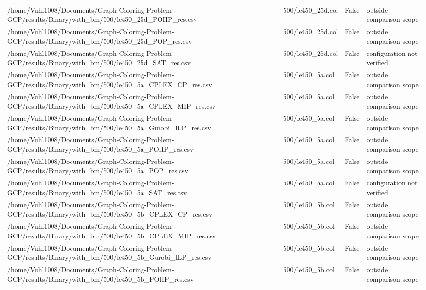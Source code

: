 \begin{table}[htbp]
\begin{tabular}{llll}
/home/Vuhl1008/Documents/Graph-Coloring-Problem-GCP/results/Binary/with\_bm/500/le450\_25d\_POHP\_res.csv & 500/le450\_25d.col & False & outside comparison scope \\
/home/Vuhl1008/Documents/Graph-Coloring-Problem-GCP/results/Binary/with\_bm/500/le450\_25d\_POP\_res.csv & 500/le450\_25d.col & False & outside comparison scope \\
/home/Vuhl1008/Documents/Graph-Coloring-Problem-GCP/results/Binary/with\_bm/500/le450\_25d\_SAT\_res.csv & 500/le450\_25d.col & False & configuration not verified \\
/home/Vuhl1008/Documents/Graph-Coloring-Problem-GCP/results/Binary/with\_bm/500/le450\_5a\_CPLEX\_CP\_res.csv & 500/le450\_5a.col & False & outside comparison scope \\
/home/Vuhl1008/Documents/Graph-Coloring-Problem-GCP/results/Binary/with\_bm/500/le450\_5a\_CPLEX\_MIP\_res.csv & 500/le450\_5a.col & False & outside comparison scope \\
/home/Vuhl1008/Documents/Graph-Coloring-Problem-GCP/results/Binary/with\_bm/500/le450\_5a\_Gurobi\_ILP\_res.csv & 500/le450\_5a.col & False & outside comparison scope \\
/home/Vuhl1008/Documents/Graph-Coloring-Problem-GCP/results/Binary/with\_bm/500/le450\_5a\_POHP\_res.csv & 500/le450\_5a.col & False & outside comparison scope \\
/home/Vuhl1008/Documents/Graph-Coloring-Problem-GCP/results/Binary/with\_bm/500/le450\_5a\_POP\_res.csv & 500/le450\_5a.col & False & outside comparison scope \\
/home/Vuhl1008/Documents/Graph-Coloring-Problem-GCP/results/Binary/with\_bm/500/le450\_5a\_SAT\_res.csv & 500/le450\_5a.col & False & configuration not verified \\
/home/Vuhl1008/Documents/Graph-Coloring-Problem-GCP/results/Binary/with\_bm/500/le450\_5b\_CPLEX\_CP\_res.csv & 500/le450\_5b.col & False & outside comparison scope \\
/home/Vuhl1008/Documents/Graph-Coloring-Problem-GCP/results/Binary/with\_bm/500/le450\_5b\_CPLEX\_MIP\_res.csv & 500/le450\_5b.col & False & outside comparison scope \\
/home/Vuhl1008/Documents/Graph-Coloring-Problem-GCP/results/Binary/with\_bm/500/le450\_5b\_Gurobi\_ILP\_res.csv & 500/le450\_5b.col & False & outside comparison scope \\
/home/Vuhl1008/Documents/Graph-Coloring-Problem-GCP/results/Binary/with\_bm/500/le450\_5b\_POHP\_res.csv & 500/le450\_5b.col & False & outside comparison scope \\

\end{tabular}
\end{table}
